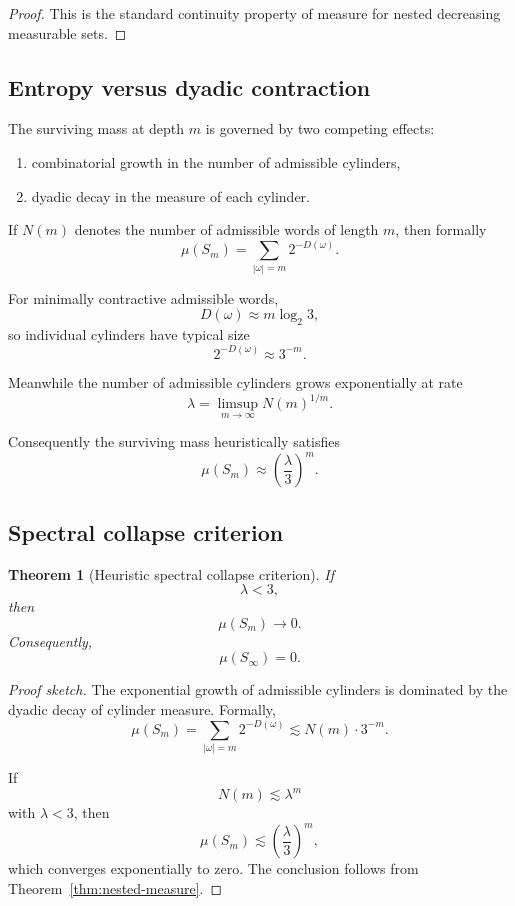 \documentclass[12pt, oneside]{article}
\numberwithin{equation}{section}
\theoremstyle{definition}
\theoremstyle{plain}
\newtheorem{theorem}{Theorem}[section]
\theoremstyle{remark}
\begin{document}
\begin{proof}
This is the standard continuity property of measure for nested
decreasing measurable sets.
\end{proof}

\subsection{Entropy versus dyadic contraction}

The surviving mass at depth \(m\) is governed by two competing effects:

\begin{enumerate}
\item combinatorial growth in the number of admissible cylinders,
\item dyadic decay in the measure of each cylinder.
\end{enumerate}

If \(N(m)\) denotes the number of admissible words of length \(m\),
then formally
\[
\mu(S_m)
=
\sum_{|\omega|=m}2^{-D(\omega)}.
\]

For minimally contractive admissible words,
\[
D(\omega)\approx m\log_2 3,
\]
so individual cylinders have typical size
\[
2^{-D(\omega)}
\approx
3^{-m}.
\]

Meanwhile the number of admissible cylinders grows exponentially at rate
\[
\lambda
=
\limsup_{m\to\infty}N(m)^{1/m}.
\]

Consequently the surviving mass heuristically satisfies
\[
\mu(S_m)
\approx
\left(\frac{\lambda}{3}\right)^m.
\]

\subsection{Spectral collapse criterion}

\begin{theorem}[Heuristic spectral collapse criterion]
\label{thm:spectral-collapse}
If
\[
\lambda < 3,
\]
then
\[
\mu(S_m)\to0.
\]
Consequently,
\[
\mu(S_\infty)=0.
\]
\end{theorem}

\begin{proof}[Proof sketch]
The exponential growth of admissible cylinders is dominated by the
dyadic decay of cylinder measure. Formally,
\[
\mu(S_m)
=
\sum_{|\omega|=m}2^{-D(\omega)}
\lesssim
N(m)\cdot 3^{-m}.
\]

If
\[
N(m)\lesssim \lambda^m
\]
with \(\lambda<3\), then
\[
\mu(S_m)\lesssim \left(\frac{\lambda}{3}\right)^m,
\]
which converges exponentially to zero.
The conclusion follows from
Theorem~\ref{thm:nested-measure}.
\end{proof}
\end{document}
